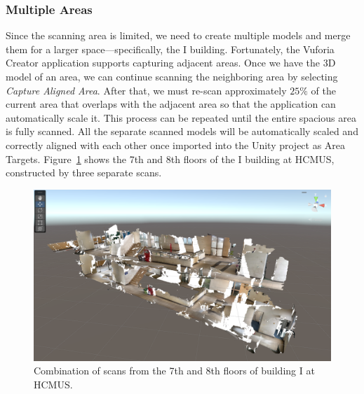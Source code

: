 \subsubsection{Multiple Areas}
Since the scanning area is limited, we need to create multiple models and merge them for a larger space—specifically, the I building. Fortunately, the Vuforia Creator application supports capturing adjacent areas. Once we have the 3D model of an area, we can continue scanning the neighboring area by selecting \textit{Capture Aligned Area}. After that, we must re-scan approximately $25\%$ of the current area that overlaps with the adjacent area so that the application can automatically scale it. This process can be repeated until the entire spacious area is fully scanned. All the separate scanned models will be automatically scaled and correctly aligned with each other once imported into the Unity project as Area Targets. Figure~\ref{fig:construct-environment-5} shows the 7th and 8th floors of the I building at HCMUS, constructed by three separate scans.

\begin{figure}[ht]
  \centering
  \includegraphics[scale=0.3]{content/resources/images/chap-problems-solutions/construct-environment-5.PNG}
  \caption{Combination of scans from the 7th and 8th floors of building I at HCMUS.}
  \label{fig:construct-environment-5}
\end{figure}

